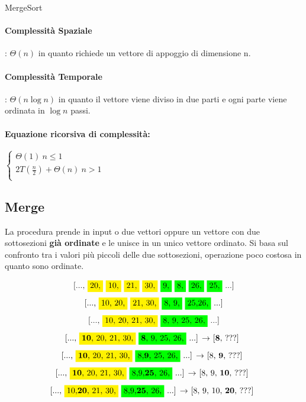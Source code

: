 \documentclass{article}
\DeclarePairedDelimiter\floor{\lfloor}{\rfloor}
\begin{document}
\begin{algorithm}[H]
\caption{MergeSort}
\end{algorithm}


\paragraph{Complessità Spaziale}: $\Theta(n)$ in quanto richiede un vettore di appoggio di dimensione n.

\paragraph{Complessità Temporale}: $\Theta(n \log n)$ in quanto il vettore viene diviso in due parti e
ogni parte viene ordinata in $\log n$ passi. 
\paragraph{Equazione ricorsiva di complessità:}
$\begin{cases}
    \Theta(1) \ n \leq 1\\
    2T(\frac{n}{2}) + \Theta(n) \ n > 1\\
\end{cases}$
\newpage
\hypertarget{merge}{} \subsection{Merge} %
La procedura prende in input o due vettori oppure un vettore con due sottosezioni \textbf{già ordinate} e le unisce in un unico vettore ordinato. 
Si basa sul confronto tra i valori più piccoli delle due sottosezioni, operazione poco costosa in quanto sono ordinate.

\[\text{[..., \colorbox{yellow}{20,} \colorbox{yellow}{10,} \colorbox{yellow}{21,} \colorbox{yellow}{30,} \colorbox{green}{9,} \colorbox{green}{8,} \colorbox{green}{26,} \colorbox{green}{25,} ...]}\]
\[\text{[..., \colorbox{yellow}{10, 20,} \colorbox{yellow}{21, 30,} \colorbox{green}{8, 9,} \colorbox{green}{25,26,} ...]}\]
\[\text{[..., \colorbox{yellow}{10, 20, 21, 30,} \colorbox{green}{8, 9, 25, 26,} ...]}\]
\[\text{[..., \colorbox{yellow}{\textbf{10}, 20, 21, 30,} \colorbox{green}{\textbf{8}, 9, 25, 26,} ...] $\rightarrow$ [\textbf{8}, ???] }\]
\[\text{[..., \colorbox{yellow}{\textbf{10}, 20, 21, 30,} \colorbox{green}{8,\textbf{9}, 25, 26,} ...] $\rightarrow$ [8, \textbf{9}, ???] }\]
\[\text{[..., \colorbox{yellow}{\textbf{10}, 20, 21, 30,} \colorbox{green}{8,9,\textbf{25}, 26,} ...] $\rightarrow$ [8, 9, \textbf{10}, ???] }\]
\[\text{[..., \colorbox{yellow}{10,\textbf{20}, 21, 30,} \colorbox{green}{8,9,\textbf{25}, 26,} ...] $\rightarrow$ [8, 9, 10, \textbf{20}, ???] }\]
\end{document}
